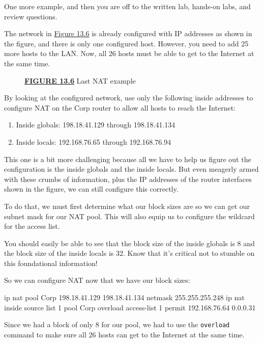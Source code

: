 One more example, and then you are off to the written lab, hands-on
labs, and review questions.

The network in
\protect\hyperlink{c13.xhtmlux5cux23figure13-6}{Figure 13.6} is already
configured with IP addresses as shown in the figure, and there is only
one configured host. However, you need to add 25 more hosts to the LAN.
Now, all 26 hosts must be able to get to the Internet at the same time.

\begin{figure}
\centering
\caption{{\protect\hyperlink{c13.xhtmlux5cux23figureanchor13-6}{\textbf{FIGURE
13.6}} Last NAT example}}
\end{figure}

By looking at the configured network, use only the following inside
addresses to configure NAT on the Corp router to allow all hosts to
reach the Internet:

\begin{enumerate}
\item
  Inside globals: 198.18.41.129 through 198.18.41.134
\item
  Inside locals: 192.168.76.65 through 192.168.76.94
\end{enumerate}

This one is a bit more challenging because all we have to help us figure
out the configuration is the inside globals and the inside locals. But
even meagerly armed with these crumbs of information, plus the IP
addresses of the router interfaces shown in the figure, we can still
configure this correctly.

To do that, we must first determine what our block sizes are so we can
get our subnet mask for our NAT pool. This will also equip us to
configure the wildcard for the access list.

You should easily be able to see that the block size of the inside
globals is 8 and the block size of the inside locals is 32. Know that
it's critical not to stumble on this foundational information!

So we can configure NAT now that we have our block sizes:

\begin{cli}
ip nat pool Corp 198.18.41.129 198.18.41.134 netmask 255.255.255.248
ip nat inside source list 1 pool Corp overload
access-list 1 permit 192.168.76.64 0.0.0.31
\end{cli}

Since we had a block of only 8 for our pool, we had to use the
\texttt{overload} command to make sure all 26 hosts can get to the
Internet at the same time.

